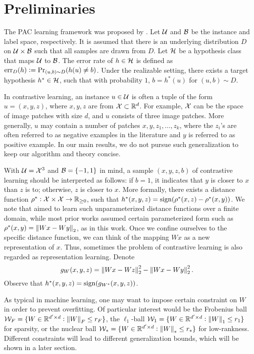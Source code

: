 \section{Preliminaries}\label{sec:setup}

The PAC learning framework was proposed by \citet{valiant1984theory}. Let $\mathcal{U}$ and $\mathcal{B}$ be the instance and label space, respectively. It is assumed that there is an underlying distribution $D$ on $\mathcal{U} \times \mathcal{B}$ such that all samples are drawn from $D$. Let $\mathcal{H}$ be a hypothesis class that maps $\mathcal{U}$ to $\mathcal{B}$. The error rate of $h \in \mathcal{H}$ is defined as $\mathrm{err}_D(h) := \mathrm{Pr}_{(u, b) \sim D}( h(u) \neq b)$. Under the realizable setting, there exists a target hypothesis $h^* \in \mathcal{H}$, such that with probability $1$, $b = h^*(u)$ for $(u, b) \sim D$.

In contrastive learning, an instance $u \in \mathcal{U}$ is often a tuple of the form $u = (x, y, z)$, where $x, y, z$ are from $\mathcal{X} \subset \mathbb{R}^{d}$. For example, $\mathcal{X}$ can be the space of image patches with size $d$, and $u$ consists of three image patches. More generally, $u$ may contain a number of patches $x, y, z_1, \dots, z_k$, where the $z_i$'s are often referred to as negative examples in the literature and $y$ is referred to as positive example. In our main results, we do not pursue such generalization to keep our algorithm and theory concise.

With $\mathcal{U} = \mathcal{X}^3$ and $\mathcal{B} = \{-1, 1\}$ in mind, a sample $(x, y, z, b)$ of contrastive learning should be interpreted as follows: if $b = 1$, it indicates that $y$ is closer to $x$ than $z$ is to; otherwise, $z$ is closer to $x$. More formally, there exists a distance function $\rho^*: \mathcal{X} \times \mathcal{X} \rightarrow \mathbb{R}_{\geq 0}$, such that $h^*(x, y, z) = \mathrm{sign}( \rho^*(x, z) - \rho^*(x, y))$. We note that \citet{alon2024contrastive} aimed to learn such unparameterized distance functions over a finite domain, while most prior works assumed certain parameterized form such as $\rho^*(x, y) = \left\lVert W x - W y \right\rVert_{2}$, as in this work. Once we confine ourselves to the specific distance function, we can think of the mapping $Wx$ as a new representation of $x$. Thus, sometimes the problem of contrastive learning is also regarded as representation learning. Denote
\begin{equation}
g_W(x, y, z) = \left\lVert Wx - Wz \right\rVert_{2}^2 - \left\lVert Wx - Wy \right\rVert_{2}^2.
\end{equation}
Observe that $h^*(x, y, z) = \mathrm{sign}( g_{W^*}(x, y, z))$.

As typical in machine learning, one may want to impose certain constraint on $W$ in order to prevent overfitting. Of particular interest would be the Frobenius ball $\mathcal{W}_F = \{W \in \mathbb{R}^{d' \times d}: \left\lVert W \right\rVert_{F} \leq r_F \}$, the $\ell_1$-ball $\mathcal{W}_1 = \{W \in \mathbb{R}^{d' \times d}: \left\lVert W \right\rVert_{1} \leq r_1 \}$ for sparsity, or the nuclear ball $\mathcal{W}_{*} = \{W \in \mathbb{R}^{d' \times d}: \left\lVert W \right\rVert_{*} \leq r_*\}$ for low-rankness. Different constraints will lead to different generalization bounds, which will be shown in a later section.


